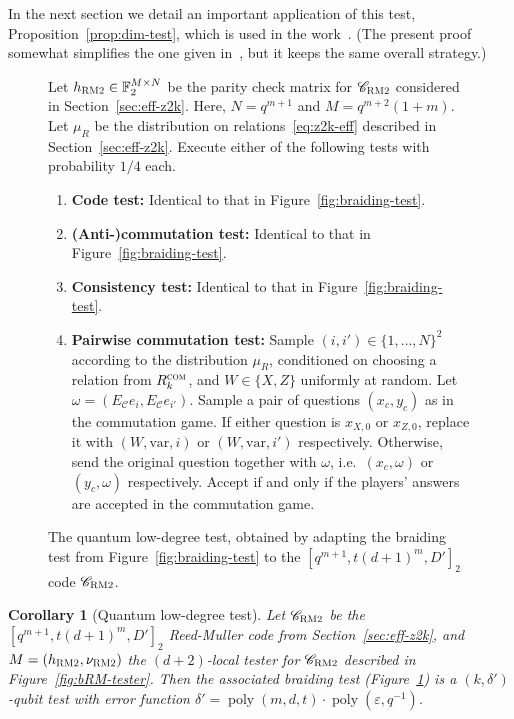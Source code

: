 \documentclass[11pt]{article}
\newtheorem{corollary}[theorem]{Corollary}
\theoremstyle{definition}
\newcommand{\code}{\mathscr{C}}
\newcommand{\F}{\ensuremath{\mathbb{F}}}
\newcommand{\com}{\textsc{com}}
\newcommand{\bRM}{\ensuremath{\textsc{RM2}}}
\DeclareMathOperator{\poly}{poly}
\newcommand{\eps}{\varepsilon}
\newcommand{\var}{\mathrm{var}}
\newenvironment{gamespec}{
  \begin{mdframed}[style=figstyle]}{
  \end{mdframed}}
\begin{document}
In the next section we detail an important application of this test, Proposition~\ref{prop:dim-test}, which is used in the work~\cite{ji2020mip}. (The present proof somewhat simplifies the one given in~\cite{ji2020mip}, but it keeps the same overall strategy.)

\begin{figure}[!htbp]
  \centering
  \begin{gamespec}
Let $h_\bRM\in \F_2^{M\times N}$ be the parity check matrix for $\code_\bRM$ considered in Section~\ref{sec:eff-z2k}. Here, $N=q^{m+1}$ and $M=q^{m+2}(1+m)$. Let $\mu_R$ be the distribution on relations~\eqref{eq:z2k-eff} described in Section~\ref{sec:eff-z2k}. Execute either of the following tests with probability $1/4$ each. 
    \begin{enumerate}
      \setlength\itemsep{1pt}
    \item \textbf{Code test:} Identical to that in Figure~\ref{fig:braiding-test}.
    \item \textbf{(Anti-)commutation test:} Identical to that in Figure~\ref{fig:braiding-test}.
		 \item \textbf{Consistency test:} Identical to that in Figure~\ref{fig:braiding-test}.
		\item \textbf{Pairwise commutation test:} Sample $(i,i')\in \{1,\ldots,N\}^2$ according to the distribution $\mu_R$, conditioned on choosing a relation from $R_k^\com$, and $W\in \{X,Z\}$ uniformly at random. 	
		Let $\omega=(E_\code e_{i}, E_\code e_{i'})$. 
		Sample a pair of questions $(x_c,y_c)$ as in the commutation game. If either question is $x_{X,0}$ or $x_{Z,0}$, replace it with $(W,\var,i)$ or $(W,\var,i')$ respectively. Otherwise, send the original question together with $\omega$, i.e.\ $(x_c,\omega)$ or $(y_c,\omega)$ respectively. Accept if and only if the players' answers are accepted in the commutation game.  
    \end{enumerate}
  \end{gamespec}
  \caption{The quantum low-degree test, obtained by adapting the braiding test from Figure~\ref{fig:braiding-test} to the $[q^{m+1},t(d+1)^m,D']_2$ code $\code_\bRM$.}
  \label{fig:pbt}
	
\end{figure}


\begin{corollary}[Quantum low-degree test]\label{cor:qld}
Let $\code_\bRM$ be the $[q^{m+1},t(d+1)^m,D']_2$ Reed-Muller code from Section~\ref{sec:eff-z2k}, and $M=(h_\bRM,\nu_\bRM)$ the $(d+2)$-local tester for $\code_\bRM$ described in Figure~\ref{fig:bRM-tester}. Then the associated braiding test (Figure~\ref{fig:pbt}) is a $(k,\delta')$-qubit test with error function $\delta' = \poly(m,d,t)\cdot\poly(\eps,q^{-1})$.
\end{corollary}
\end{document}
